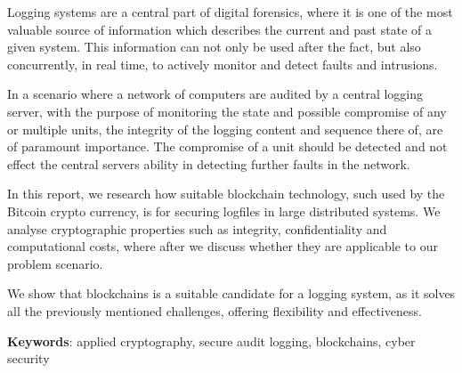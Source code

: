 
Logging systems are a central part of digital forensics, where it
is one of the most valuable source of information which describes
the current and past state of a given system. This information
can not only be used after the fact, but also concurrently, in
real time, to actively monitor and detect faults and intrusions.

In a scenario where a network of computers are audited by a
central logging server, with the purpose of monitoring the state and
possible compromise of any or multiple units, the integrity of
the logging content and sequence there of, are of paramount
importance. The compromise of a unit should be detected and not
effect the central servers ability in detecting further faults
in the network.

In this report, we research how suitable blockchain technology, such
used by the Bitcoin crypto currency, is for securing logfiles in large
distributed systems. We analyse cryptographic properties such as
integrity, confidentiality and computational costs, where after we
discuss whether they are applicable to our problem scenario.

We show that blockchains is a suitable candidate for a logging system,
as it solves all the previously mentioned challenges, offering
flexibility and effectiveness.

\textbf{Keywords}: applied cryptography, secure audit logging,
blockchains, cyber security
